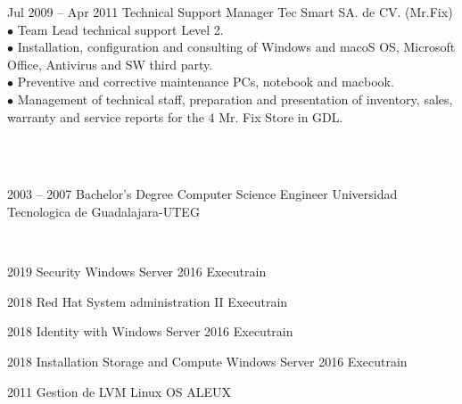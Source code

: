 \documentclass[9pt]{developercv} %
\begin{document}
\begin{entrylist}
	\entry
	{Jul 2009 -- Apr 2011}
		{Technical Support Manager}
	{Tec Smart SA. de CV. (Mr.Fix)}
	{{}\\$\bullet$ Team Lead technical support Level 2.
		\\$\bullet$ Installation, configuration and consulting of Windows and macoS OS, Microsoft Office, Antivirus and SW third party.
		\\$\bullet$ Preventive and corrective maintenance PCs, notebook and macbook.
		\\$\bullet$ Management of technical staff, preparation and presentation of inventory, sales, warranty and service reports for the 4 Mr. Fix Store in GDL. \\ \\}
\end{entrylist}


\\

\begin{entrylist}
	\entry
		{2003 -- 2007}
		{Bachelor's Degree}
		{Computer Science Engineer}
		{Universidad Tecnologica de Guadalajara-UTEG}
\end{entrylist}

\\

\begin{entrylist}
	\entry
		{2019}
		{Security Windows Server 2016}
		{Executrain}
		{}
\end{entrylist}

\begin{entrylist}
	\entry
	{2018}
	{Red Hat System administration II}
	{Executrain}
	{}
\end{entrylist}

\begin{entrylist}
	\entry
	{2018}
	{Identity with Windows Server 2016}
	{Executrain}
	{}
\end{entrylist}


\begin{entrylist}
	\entry
	{2018}
	{Installation Storage and Compute Windows Server 2016}
	{Executrain}
	{}
\end{entrylist}

\begin{entrylist}
	\entry
	{2011}
	{Gestion de LVM Linux OS}
	{ALEUX}
	{}
\end{entrylist}
\end{document}

